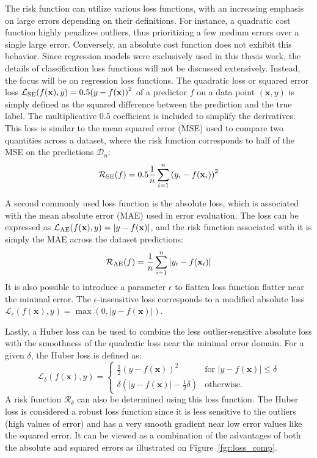 \documentclass[main]{subfiles}
\begin{document}
The risk function can utilize various loss functions, with an increasing emphasis on large errors depending on their definitions. For instance, a quadratic cost function highly penalizes outliers, thus prioritizing a few medium errors over a single large error. Conversely, an absolute cost function does not exhibit this behavior. Since regression models were exclusively used in this thesis work, the details of classification loss functions will not be discussed extensively. Instead, the focus will be on regression loss functions. The quadratic loss or squared error loss $\mathcal{L}_{\text{SE}}(f(\mathbf{x}),y)=0.5{\left(y-f(\mathbf{x})\right)}^2$ of a predictor $f$ on a data point $(\mathbf{x},y)$ is simply defined as the squared difference between the prediction and the true label. The multiplicative $0.5$ coefficient is included to simplify the derivatives. This loss is similar to the mean squared error (MSE) used to compare two quantities across a dataset, where the risk function corresponds to half of the MSE on the predictions $\mathcal{D}_n$:
\begin{equation}
  \mathcal{R}_{\text{SE}}(f) = 0.5\frac{1}{n}\sum_{i=1}^n {\left(y_i-f(\mathbf{x}_i)\right)}^2
\end{equation}

A second commonly used loss function is the absolute loss, which is associated with the mean absolute error (MAE) used in error evaluation. The loss can be expressed as $\mathcal{L}_{\text{AE}}(f(\mathbf{x}),y)=\left|y-f(\mathbf{x})\right|$, and the risk function associated with it is simply the MAE across the dataset predictions:
\begin{equation}
  \mathcal{R}_{\text{AE}}(f) = \frac{1}{n}\sum_{i=1}^n \left|y_i-f(\mathbf{x}_i)\right|
\end{equation}
It is also possible to introduce a parameter $\epsilon$ to flatten loss function flatter near the minimal error. The $\epsilon$-insensitive loss corresponds to a modified absolute loss $\mathcal{L}_{\epsilon}(f(\mathbf{x}),y)=\max\left(0,\left|y-f(\mathbf{x})\right|\right)$.

Lastly, a Huber loss can be used to combine the less outlier-sensitive absolute loss with the smoothness of the quadratic loss near the minimal error domain. For a given $\delta$, the Huber loss is defined as:
\begin{equation}
  \mathcal{L}_{\delta}(f(\mathbf{x}),y) = \left\{
    \begin{array}{ll}
        \tfrac{1}{2}{\left(y-f(\mathbf{x})\right)}^2 & \mbox{for } \left|y-f(\mathbf{x})\right| \leq \delta \\
        \delta\left(\left|y-f(\mathbf{x})\right| - \tfrac{1}{2}\delta\right) & \mbox{otherwise.}
    \end{array}
  \right.
\end{equation}
A risk function $\mathcal{R}_{\delta}$ can also be determined using this loss function. The Huber loss is considered a robust loss function since it is less sensitive to the outliers (high values of error) and has a very smooth gradient near low error values like the squared error. It can be viewed as a combination of the advantages of both the absolute and squared errors as illustrated on Figure~\ref{fgr:loss_comp}.
\end{document}
